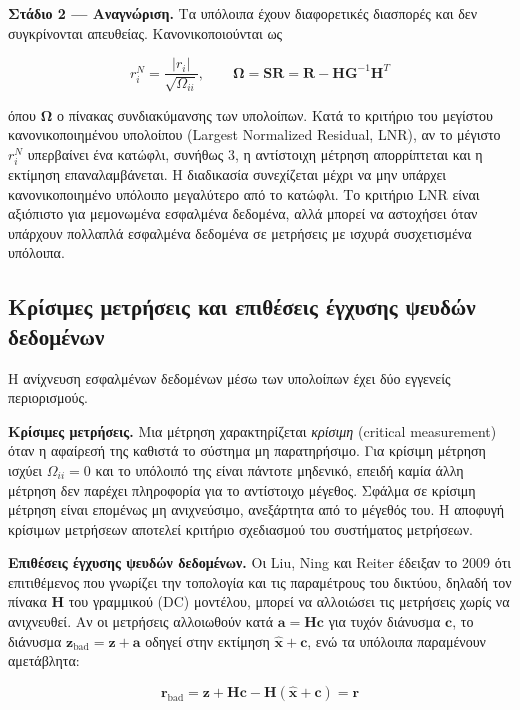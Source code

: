 \textbf{Στάδιο 2 --- Αναγνώριση.} Τα υπόλοιπα έχουν διαφορετικές διασπορές και δεν
συγκρίνονται απευθείας. Κανονικοποιούνται ως

\begin{equation}
r_i^{N} = \frac{|r_i|}{\sqrt{\Omega_{ii}}}, \qquad
\boldsymbol{\Omega} = \mathbf{S}\mathbf{R} = \mathbf{R} - \mathbf{H}\mathbf{G}^{-1}\mathbf{H}^{T}
\label{eq:normres}
\end{equation}

όπου $\boldsymbol{\Omega}$ ο πίνακας συνδιακύμανσης των υπολοίπων. Κατά το κριτήριο του
μεγίστου κανονικοποιημένου υπολοίπου (Largest Normalized Residual, LNR), αν το μέγιστο
$r_i^{N}$ υπερβαίνει ένα κατώφλι, συνήθως 3, η αντίστοιχη μέτρηση απορρίπτεται και η
εκτίμηση επαναλαμβάνεται. Η διαδικασία συνεχίζεται μέχρι να μην υπάρχει κανονικοποιημένο
υπόλοιπο μεγαλύτερο από το κατώφλι. Το κριτήριο LNR είναι αξιόπιστο για μεμονωμένα
εσφαλμένα δεδομένα, αλλά μπορεί να αστοχήσει όταν υπάρχουν πολλαπλά εσφαλμένα δεδομένα σε
μετρήσεις με ισχυρά συσχετισμένα υπόλοιπα.

\subsection{Κρίσιμες μετρήσεις και επιθέσεις έγχυσης ψευδών δεδομένων}

Η ανίχνευση εσφαλμένων δεδομένων μέσω των υπολοίπων έχει δύο εγγενείς περιορισμούς.

\textbf{Κρίσιμες μετρήσεις.} Μια μέτρηση χαρακτηρίζεται \emph{κρίσιμη} (critical measurement)
όταν η αφαίρεσή της καθιστά το σύστημα μη παρατηρήσιμο. Για κρίσιμη μέτρηση ισχύει
$\Omega_{ii} = 0$ και το υπόλοιπό της είναι πάντοτε μηδενικό, επειδή καμία άλλη μέτρηση δεν
παρέχει πληροφορία για το αντίστοιχο μέγεθος. Σφάλμα σε κρίσιμη μέτρηση είναι επομένως μη
ανιχνεύσιμο, ανεξάρτητα από το μέγεθός του. Η αποφυγή κρίσιμων μετρήσεων αποτελεί κριτήριο
σχεδιασμού του συστήματος μετρήσεων.

\textbf{Επιθέσεις έγχυσης ψευδών δεδομένων.} Οι Liu, Ning και Reiter έδειξαν το 2009 ότι
επιτιθέμενος που γνωρίζει την τοπολογία και τις παραμέτρους του δικτύου, δηλαδή τον πίνακα
$\mathbf{H}$ του γραμμικού (DC) μοντέλου, μπορεί να αλλοιώσει τις μετρήσεις χωρίς να
ανιχνευθεί. Αν οι μετρήσεις αλλοιωθούν κατά $\mathbf{a} = \mathbf{H}\mathbf{c}$ για τυχόν
διάνυσμα $\mathbf{c}$, το διάνυσμα $\mathbf{z}_{\text{bad}} = \mathbf{z} + \mathbf{a}$ οδηγεί
στην εκτίμηση $\hat{\mathbf{x}} + \mathbf{c}$, ενώ τα υπόλοιπα παραμένουν αμετάβλητα:

\begin{equation}
\mathbf{r}_{\text{bad}} = \mathbf{z} + \mathbf{H}\mathbf{c}
        - \mathbf{H}(\hat{\mathbf{x}} + \mathbf{c}) = \mathbf{r}
\label{eq:fdia}
\end{equation}

